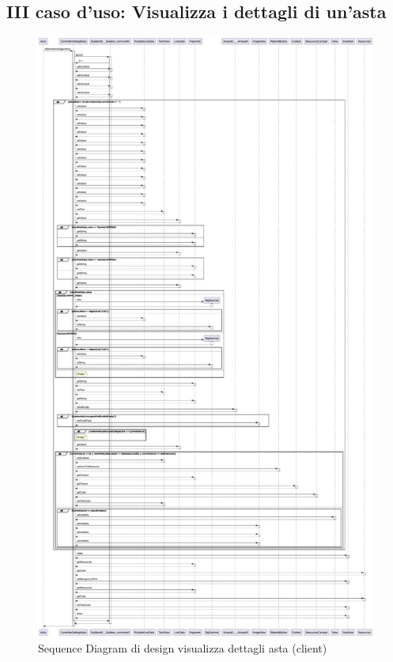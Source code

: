        \subsection{III caso d'uso: Visualizza i dettagli di un'asta}
            \begin{figure}[htbp!]
                \centering
                    \includegraphics[width=0.71\linewidth]{Immagini/Diagrammi/Sequence Diagram/Design/Client Sequence Design/ClientSequenceDettagliAstaDesign.pdf}
                \caption{Sequence Diagram di design visualizza dettagli asta (client)}
                \label{fig:Sequence Diagram di design visualizza dettagli asta (client)}
            \end{figure}


